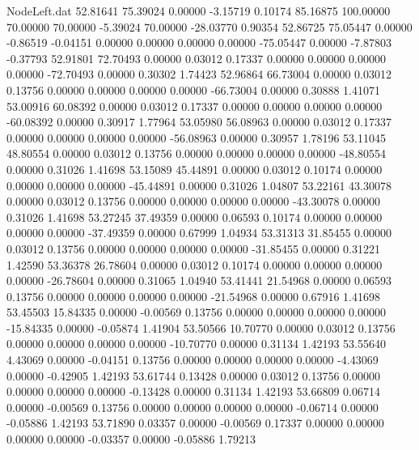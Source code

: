 \begin{filecontents}{NodeLeft.dat}
  52.81641   75.39024    0.00000    -3.15719    0.10174   85.16875  100.00000   70.00000   70.00000   -5.39024   70.00000  -28.03770    0.90354
  52.86725   75.05447    0.00000    -0.86519   -0.04151    0.00000    0.00000    0.00000    0.00000  -75.05447    0.00000   -7.87803   -0.37793
  52.91801   72.70493    0.00000     0.03012    0.17337    0.00000    0.00000    0.00000    0.00000  -72.70493    0.00000    0.30302    1.74423
  52.96864   66.73004    0.00000     0.03012    0.13756    0.00000    0.00000    0.00000    0.00000  -66.73004    0.00000    0.30888    1.41071
  53.00916   60.08392    0.00000     0.03012    0.17337    0.00000    0.00000    0.00000    0.00000  -60.08392    0.00000    0.30917    1.77964
  53.05980   56.08963    0.00000     0.03012    0.17337    0.00000    0.00000    0.00000    0.00000  -56.08963    0.00000    0.30957    1.78196
  53.11045   48.80554    0.00000     0.03012    0.13756    0.00000    0.00000    0.00000    0.00000  -48.80554    0.00000    0.31026    1.41698
  53.15089   45.44891    0.00000     0.03012    0.10174    0.00000    0.00000    0.00000    0.00000  -45.44891    0.00000    0.31026    1.04807
  53.22161   43.30078    0.00000     0.03012    0.13756    0.00000    0.00000    0.00000    0.00000  -43.30078    0.00000    0.31026    1.41698
  53.27245   37.49359    0.00000     0.06593    0.10174    0.00000    0.00000    0.00000    0.00000  -37.49359    0.00000    0.67999    1.04934
  53.31313   31.85455    0.00000     0.03012    0.13756    0.00000    0.00000    0.00000    0.00000  -31.85455    0.00000    0.31221    1.42590
  53.36378   26.78604    0.00000     0.03012    0.10174    0.00000    0.00000    0.00000    0.00000  -26.78604    0.00000    0.31065    1.04940
  53.41441   21.54968    0.00000     0.06593    0.13756    0.00000    0.00000    0.00000    0.00000  -21.54968    0.00000    0.67916    1.41698
  53.45503   15.84335    0.00000    -0.00569    0.13756    0.00000    0.00000    0.00000    0.00000  -15.84335    0.00000   -0.05874    1.41904
  53.50566   10.70770    0.00000     0.03012    0.13756    0.00000    0.00000    0.00000    0.00000  -10.70770    0.00000    0.31134    1.42193
  53.55640    4.43069    0.00000    -0.04151    0.13756    0.00000    0.00000    0.00000    0.00000   -4.43069    0.00000   -0.42905    1.42193
  53.61744    0.13428    0.00000     0.03012    0.13756    0.00000    0.00000    0.00000    0.00000   -0.13428    0.00000    0.31134    1.42193
  53.66809    0.06714    0.00000    -0.00569    0.13756    0.00000    0.00000    0.00000    0.00000   -0.06714    0.00000   -0.05886    1.42193
  53.71890    0.03357    0.00000    -0.00569    0.17337    0.00000    0.00000    0.00000    0.00000   -0.03357    0.00000   -0.05886    1.79213

\end{filecontents}
